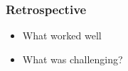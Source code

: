 \subsubsection{Retrospective}

\begin{itemize}
	\item What worked well
	\item What was challenging?
\end{itemize}
